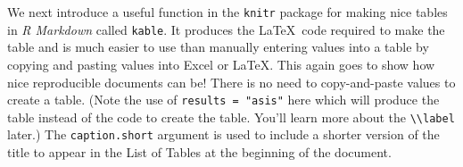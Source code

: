 \documentclass[12pt,twoside]{reedthesis}
\begin{document}
  We next introduce a useful function in the \texttt{knitr} package for
  making nice tables in \emph{R Markdown} called \texttt{kable}. It
  produces the \LaTeX~code required to make the table and is much easier
  to use than manually entering values into a table by copying and pasting
  values into Excel or \LaTeX. This again goes to show how nice
  reproducible documents can be! There is no need to copy-and-paste values
  to create a table. (Note the use of \texttt{results\ =\ "asis"} here
  which will produce the table instead of the code to create the table.
  You'll learn more about the
  \texttt{\textbackslash{}\textbackslash{}label} later.) The
  \texttt{caption.short} argument is used to include a shorter version of
  the title to appear in the List of Tables at the beginning of the
  document.
  
  \begin{Shaded}
  \begin{Highlighting}[]
   \CharTok{\textbackslash{}\textbackslash{}}\NormalTok{,} \NormalTok{)}
  \end{Highlighting}
  \end{Shaded}
  
\end{document}
